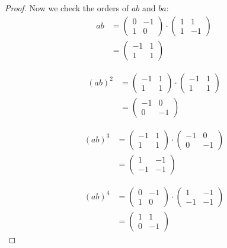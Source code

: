 \documentclass[11pt, reqno]{amsart}
\theoremstyle{plain}
\theoremstyle{definition}
\theoremstyle{example}
\begin{document}
\begin{enumerate}[1.]
\begin{enumerate}
\begin{proof}
Now we check the orders of $ab$ and $ba$:
\begin{align*}
ab &= \begin{pmatrix} 0 & -1 \\ 1 & 0 \end{pmatrix} \cdot \begin{pmatrix} 1 & 1 \\ 1 & -1 \end{pmatrix}\\
&= \begin{pmatrix} -1 & 1 \\ 1 & 1 \end{pmatrix}
\end{align*}

\begin{align*}
(ab)^2 &= \begin{pmatrix} -1 & 1 \\ 1 & 1 \end{pmatrix} \cdot \begin{pmatrix} -1 & 1 \\ 1 & 1 \end{pmatrix}\\
&= \begin{pmatrix} -1 & 0 \\ 0 & -1 \end{pmatrix}
\end{align*}

\begin{align*}
(ab)^3 &= \begin{pmatrix} -1 & 1 \\ 1 & 1 \end{pmatrix} \cdot \begin{pmatrix} -1 & 0 \\ 0 & -1 \end{pmatrix}\\
&= \begin{pmatrix} 1 & -1 \\ -1 & -1 \end{pmatrix}
\end{align*}

\begin{align*}
(ab)^4 &= \begin{pmatrix} 0 & -1 \\ 1 & 0 \end{pmatrix} \cdot \begin{pmatrix} 1 & -1 \\ -1 & -1 \end{pmatrix}\\
&= \begin{pmatrix} 1 & 1 \\ 0 & -1 \end{pmatrix}
\end{align*}
\end{proof}


\end{enumerate}
\end{enumerate}
\end{document}
